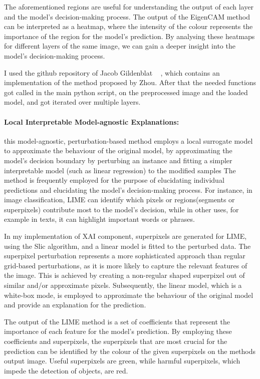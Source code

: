 The aforementioned regions are useful for understanding the output of each layer and the model's decision-making process.
The output of the EigenCAM method can be interpreted as a heatmap, where the intensity of the colour represents the importance of
the region for the model's prediction.
By analysing these heatmaps for different layers of the same image, we can gain a deeper insight into the model's decision-making process.

I used the github repository of Jacob Gildenblat ~\cite{jacobgilpytorchcam}
, which contains an implementation of the method proposed by Zhou\cite{Zhou_2016}.
After that the needed functions got called in the main python script, on the preprocessed image and the loaded model, and got iterated over multiple layers.

\paragraph{Local Interpretable Model-agnostic Explanations:}\label{par:lime}

this model-agnostic, perturbation-based method employs a local surrogate model to approximate the behaviour of the original model, by
approximating the  model's decision boundary by perturbing an instance and fitting a simpler interpretable model (such as linear regression) to the modified samples
The method is frequently employed for the purpose of elucidating individual predictions and elucidating the model's decision-making process. For instance, in image classification, LIME can identify which pixels or regions(segments or superpixels) contribute most to the model's decision, while in other uses, for example in texts, it can highlight important words or phrases.

In my implementation of XAI component,  superpixels are generated for LIME, using the Slic algorithm, and a linear model is fitted to the perturbed data.
The superpixel perturbation represents a more sophisticated approach than regular grid-based perturbations, as it is more likely to capture the relevant features of the image.
This is achieved by creating a non-regular shaped superpixel out of similar and/or approximate pixels.
Subsequently, the linear model, which is a white-box mode, is employed to approximate the behaviour of the original model and provide an explanation for the prediction.

The output of the LIME method is a set of coefficients that represent the importance of each feature for the model's prediction.
By employing these coefficients and superpixels, the superpixels that are most crucial for the prediction can be identified by the
colour of the given superpixels on the methods output image.
Useful superpixels are green, while harmful superpixels, which impede the detection of objects, are red.

